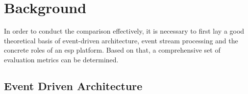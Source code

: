 \chapter{Background} \label{chap:background}
In order to conduct the comparison effectively, it is necessary to first lay a good theoretical basis of event-driven architecture, event stream processing and the concrete roles of an \acrshort{esp} platform. Based on that, a comprehensive set of evaluation metrics can be determined.


\section{Event Driven Architecture} \label{section:eventdriven}





